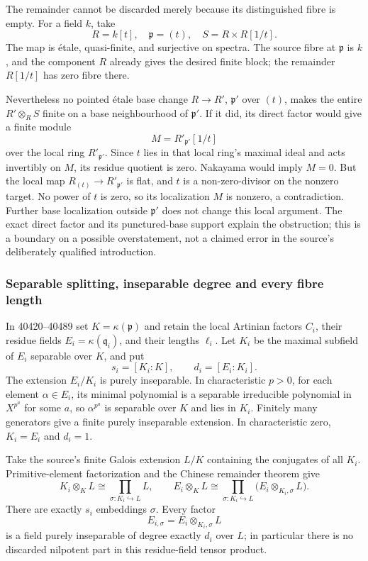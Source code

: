 The remainder cannot be discarded merely because its distinguished fibre is empty. For a field \(k\), take \[
R=k[t],\quad \mathfrak p=(t),\quad
S=R\times R[1/t].
\] The map is étale, quasi-finite, and surjective on spectra. The source fibre at \(\mathfrak p\) is \(k\), and the component \(R\) already gives the desired finite block; the remainder \(R[1/t]\) has zero fibre there.

Nevertheless no pointed étale base change \(R\to R'\), \(\mathfrak p'\) over \((t)\), makes the entire \(R'\otimes_R S\) finite on a base neighbourhood of \(\mathfrak p'\). If it did, its direct factor would give a finite module \[
M=R'_{\mathfrak p'}[1/t]
\] over the local ring \(R'_{\mathfrak p'}\). Since \(t\) lies in that local ring's maximal ideal and acts invertibly on \(M\), its residue quotient is zero. Nakayama would imply \(M=0\). But the local map \(R_{(t)}\to R'_{\mathfrak p'}\) is flat, and \(t\) is a non-zero-divisor on the nonzero target. No power of \(t\) is zero, so its localization \(M\) is nonzero, a contradiction. Further base localization outside \(\mathfrak p'\) does not change this local argument. The exact direct factor and its punctured-base support explain the obstruction; this is a boundary on a possible overstatement, not a claimed error in the source's deliberately qualified introduction.

\subsubsection{Separable splitting, inseparable degree and every fibre length}\label{separable-splitting-inseparable-degree-and-every-fibre-length}

In 40420--40489 set \(K=\kappa(\mathfrak p)\) and retain the local Artinian factors \(C_i\), their residue fields \(E_i=\kappa(\mathfrak q_i)\), and their lengths \(\ell_i\). Let \(K_i\) be the maximal subfield of \(E_i\) separable over \(K\), and put \[
s_i=[K_i:K],\qquad d_i=[E_i:K_i].
\] The extension \(E_i/K_i\) is purely inseparable. In characteristic \(p>0\), for each element \(\alpha\in E_i\), its minimal polynomial is a separable irreducible polynomial in \(X^{p^a}\) for some \(a\), so \(\alpha^{p^a}\) is separable over \(K\) and lies in \(K_i\). Finitely many generators give a finite purely inseparable extension. In characteristic zero, \(K_i=E_i\) and \(d_i=1\).

Take the source's finite Galois extension \(L/K\) containing the conjugates of all \(K_i\). Primitive-element factorization and the Chinese remainder theorem give \[
K_i\otimes_K L\cong
\prod_{\sigma:K_i\hookrightarrow L}L,\qquad
E_i\otimes_K L\cong
\prod_{\sigma:K_i\hookrightarrow L}
\bigl(E_i\otimes_{K_i,\sigma}L\bigr).
\] There are exactly \(s_i\) embeddings \(\sigma\). Every factor \[
E_{i,\sigma}=E_i\otimes_{K_i,\sigma}L
\] is a field purely inseparable of degree exactly \(d_i\) over \(L\); in particular there is no discarded nilpotent part in this residue-field tensor product.

